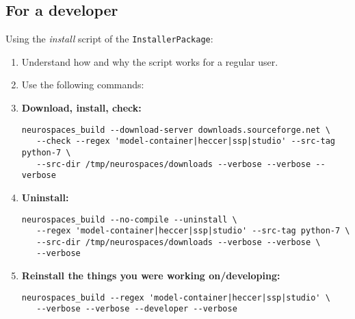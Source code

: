 \documentclass[12pt]{article}
\begin{document}
\subsection*{For a developer}

Using the {\it install} script of the {\tt InstallerPackage}:
\begin{enumerate}
\item Understand how and why the script works for a regular user.
\item Use the following commands:

\item[] {\bf Download, install, check:}
\begin{verbatim}
neurospaces_build --download-server downloads.sourceforge.net \
   --check --regex 'model-container|heccer|ssp|studio' --src-tag python-7 \
   --src-dir /tmp/neurospaces/downloads --verbose --verbose --verbose
\end{verbatim}

\item[]{\bf Uninstall:}
\begin{verbatim}
neurospaces_build --no-compile --uninstall \
   --regex 'model-container|heccer|ssp|studio' --src-tag python-7 \
   --src-dir /tmp/neurospaces/downloads --verbose --verbose \
   --verbose
\end{verbatim}

\item[]{\bf Reinstall the things you were working on/developing:}
\begin{verbatim}
neurospaces_build --regex 'model-container|heccer|ssp|studio' \
   --verbose --verbose --developer --verbose
\end{verbatim}

\end{enumerate}
\end{document}
